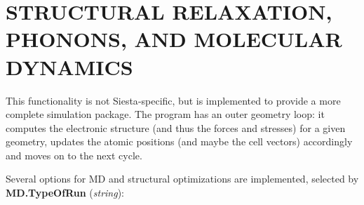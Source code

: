 \documentclass[11pt]{article}
\begin{document}
\vspace{5pt}
\section{STRUCTURAL RELAXATION, PHONONS, AND MOLECULAR DYNAMICS}

This functionality is not {\sc Siesta}-specific, but is implemented to
provide a more complete simulation package. The program has an outer
geometry loop: it computes the electronic structure (and
thus the forces and stresses) for a given geometry, updates the
atomic positions (and maybe the cell vectors) accordingly and moves on
to the next cycle.

Several options for MD and structural optimizations are
implemented, selected by
{\bf MD.TypeOfRun} ({\it string}):
\end{document}
